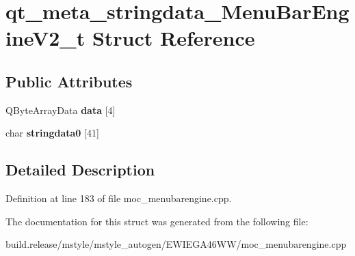 \hypertarget{structqt__meta__stringdata___menu_bar_engine_v2__t}{}\section{qt\+\_\+meta\+\_\+stringdata\+\_\+\+Menu\+Bar\+Engine\+V2\+\_\+t Struct Reference}
\label{structqt__meta__stringdata___menu_bar_engine_v2__t}
\subsection*{Public Attributes}
\begin{DoxyCompactItemize}
\item 
\mbox{\label{structqt__meta__stringdata___menu_bar_engine_v2__t_a1aa7a6683962230aef4ae9e30009f54b}} 
Q\+Byte\+Array\+Data {\bfseries data} \mbox{[}4\mbox{]}
\item 
\mbox{\label{structqt__meta__stringdata___menu_bar_engine_v2__t_a4f90869937ae36f5a731c5bf518a19ca}} 
char {\bfseries stringdata0} \mbox{[}41\mbox{]}
\end{DoxyCompactItemize}


\subsection{Detailed Description}


Definition at line 183 of file moc\+\_\+menubarengine.\+cpp.



The documentation for this struct was generated from the following file\+:\begin{DoxyCompactItemize}
\item 
build.\+release/mstyle/mstyle\+\_\+autogen/\+E\+W\+I\+E\+G\+A46\+W\+W/moc\+\_\+menubarengine.\+cpp\end{DoxyCompactItemize}
